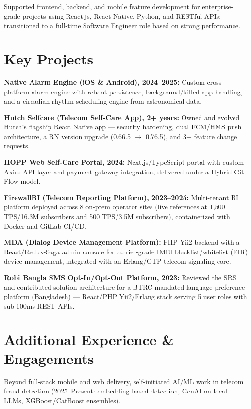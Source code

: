 \documentclass[10.5pt]{article}
\begin{document}
\begin{cvitems}
  \item Supported frontend, backend, and mobile feature development for enterprise-grade projects using React.js, React Native, Python, and RESTful APIs; transitioned to a full-time Software Engineer role based on strong performance.
\end{cvitems}

\section*{Key Projects}
\begin{cvitems}
  \item \textbf{Native Alarm Engine (iOS \& Android), 2024--2025:} Custom cross-platform alarm engine with reboot-persistence, background/killed-app handling, and a circadian-rhythm scheduling engine from astronomical data.
  \item \textbf{Hutch Selfcare (Telecom Self-Care App), 2+ years:} Owned and evolved Hutch's flagship React Native app --- security hardening, dual FCM/HMS push architecture, a RN version upgrade (0.66.5 $\rightarrow$ 0.76.5), and 3+ feature change requests.
  \item \textbf{HOPP Web Self-Care Portal, 2024:} Next.js/TypeScript portal with custom Axios API layer and payment-gateway integration, delivered under a Hybrid Git Flow model.
  \item \textbf{FirewallBI (Telecom Reporting Platform), 2023--2025:} Multi-tenant BI platform deployed across 8 on-prem operator sites (live references at 1,500 TPS/16.3M subscribers and 500 TPS/3.5M subscribers), containerized with Docker and GitLab CI/CD.
  \item \textbf{MDA (Dialog Device Management Platform):} PHP Yii2 backend with a React/Redux-Saga admin console for carrier-grade IMEI blacklist/whitelist (EIR) device management, integrated with an Erlang/OTP telecom-signaling core.
  \item \textbf{Robi Bangla SMS Opt-In/Opt-Out Platform, 2023:} Reviewed the SRS and contributed solution architecture for a BTRC-mandated language-preference platform (Bangladesh) --- React/PHP Yii2/Erlang stack serving 5 user roles with sub-100ms REST APIs.
\end{cvitems}

\section*{Additional Experience \& Engagements}
Beyond full-stack mobile and web delivery, self-initiated AI/ML work in telecom fraud detection (2025--Present: embedding-based detection, GenAI on local LLMs, XGBoost/CatBoost ensembles).
\end{document}
